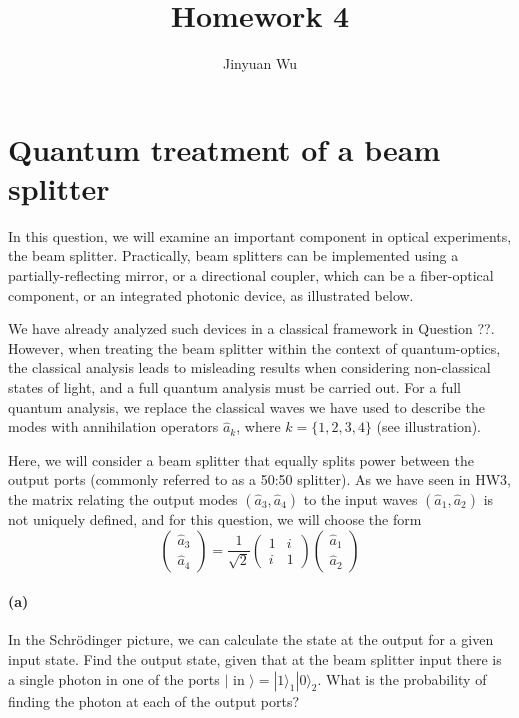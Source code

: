 \documentclass[hyperref, a4paper]{article}
\title{Homework 4}
\author{Jinyuan Wu}
\begin{document}
\maketitle

\section{}

\section{Quantum treatment of a beam splitter}

In this question, we will examine an important component in optical experiments, the beam splitter. Practically, beam splitters can be implemented using a partially-reflecting mirror, or a directional coupler, which can be a fiber-optical component, or an integrated photonic device, as illustrated below.

We have already analyzed such devices in a classical framework in Question ??. However, when treating the beam splitter within the context of quantum-optics, the classical analysis leads to misleading results when considering non-classical states of light, and a full quantum analysis must be carried out. For a full quantum analysis, we replace the classical waves we have used to describe the modes with annihilation operators $\hat{a}_k$, where $k=\{1,2,3,4\}$ (see illustration).

Here, we will consider a beam splitter that equally splits power between the output ports (commonly referred to as a 50:50 splitter). As we have seen in HW3, the matrix relating the output modes $\left(\hat{a}_3, \hat{a}_4\right)$ to the input waves $\left(\hat{a}_1, \hat{a}_2\right)$ is not uniquely defined, and for this question, we will choose the form
$$
\left(\begin{array}{l}
\hat{a}_3 \\
\hat{a}_4
\end{array}\right)=\frac{1}{\sqrt{2}}\left(\begin{array}{ll}
1 & i \\
i & 1
\end{array}\right)\left(\begin{array}{l}
\hat{a}_1 \\
\hat{a}_2
\end{array}\right)
$$

\paragraph*{(a)} In the Schrödinger picture, we can calculate the state at the output for a given input state. Find the output state, given that at the beam splitter input there is a single photon in one of the ports $\mid$ in $\rangle=|1\rangle_1|0\rangle_2$. What is the probability of finding the photon at each of the output ports?
\end{document}

